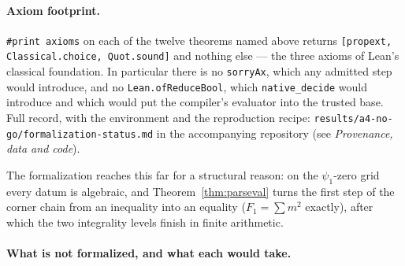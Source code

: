\documentclass[11pt]{article}
\theoremstyle{plain}
\theoremstyle{definition}
\theoremstyle{remark}
\begin{document}
\paragraph{Axiom footprint.}
\texttt{\#print axioms} on each of the twelve theorems named above returns
\texttt{[propext, Classical.choice, Quot.sound]} and nothing else --- the three
axioms of Lean's classical foundation. In particular there is no
\texttt{sorryAx}, which any admitted step would introduce, and no
\texttt{Lean.ofReduceBool}, which \texttt{native\_decide} would introduce and
which would put the compiler's evaluator into the trusted base. Full record,
with the environment and the reproduction recipe:
\texttt{results/a4-no-go/}\allowbreak\texttt{formalization-status.md} in the
accompanying repository (see \emph{Provenance, data and code}).

The formalization reaches this far for a structural reason: on the
$\psi_1$-zero grid every datum is algebraic, and Theorem~\ref{thm:parseval}
turns the first step of the corner chain from an inequality into an equality
($F_1 = \sum m^2$ exactly), after which the two integrality levels finish in
finite arithmetic.

\paragraph{What is not formalized, and what each would take.}
\end{document}
